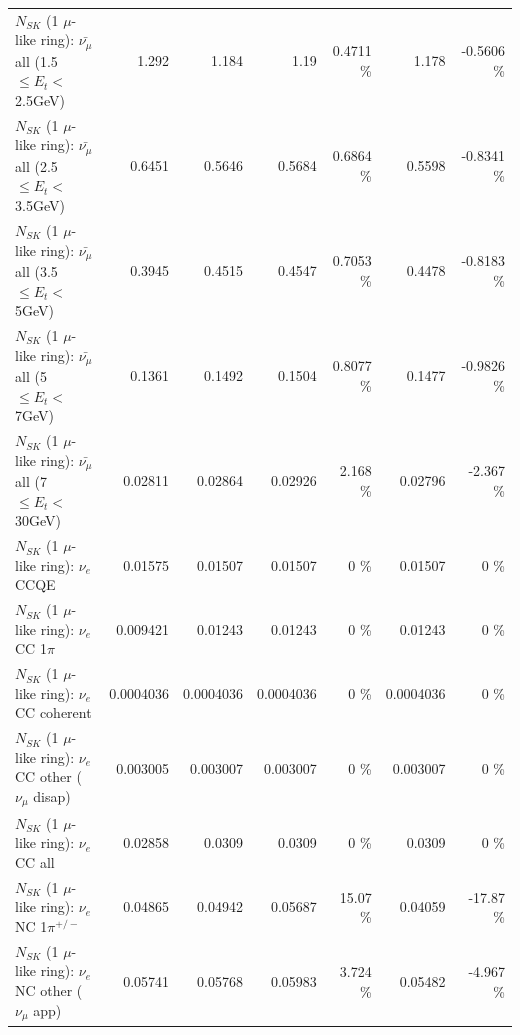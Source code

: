 \begin{table}
\begin{tabular}{| l | r | r | r  r | r  r |}
 $N_{SK}$ (1 $\mu$-like ring): $\bar{\nu_{\mu}}$ all (1.5 $\leq E_{t} <$ 2.5GeV) &           1.292 &           1.184 &            1.19 &   0.4711 \%  &           1.178 &  -0.5606 \%  \\ 
 $N_{SK}$ (1 $\mu$-like ring): $\bar{\nu_{\mu}}$ all (2.5 $\leq E_{t} <$ 3.5GeV) &          0.6451 &          0.5646 &          0.5684 &   0.6864 \%  &          0.5598 &  -0.8341 \%  \\ 
   $N_{SK}$ (1 $\mu$-like ring): $\bar{\nu_{\mu}}$ all (3.5 $\leq E_{t} <$ 5GeV) &          0.3945 &          0.4515 &          0.4547 &   0.7053 \%  &          0.4478 &  -0.8183 \%  \\ 
     $N_{SK}$ (1 $\mu$-like ring): $\bar{\nu_{\mu}}$ all (5 $\leq E_{t} <$ 7GeV) &          0.1361 &          0.1492 &          0.1504 &   0.8077 \%  &          0.1477 &  -0.9826 \%  \\ 
    $N_{SK}$ (1 $\mu$-like ring): $\bar{\nu_{\mu}}$ all (7 $\leq E_{t} <$ 30GeV) &         0.02811 &         0.02864 &         0.02926 &    2.168 \%  &         0.02796 &   -2.367 \%  \\ 
\hline
\hline
\hline
                                      $N_{SK}$ (1 $\mu$-like ring): $\nu_e$ CCQE &         0.01575 &         0.01507 &         0.01507 &        0 \%  &         0.01507 &        0 \%  \\ 
                                 $N_{SK}$ (1 $\mu$-like ring): $\nu_e$ CC 1$\pi$ &        0.009421 &         0.01243 &         0.01243 &        0 \%  &         0.01243 &        0 \%  \\ 
                               $N_{SK}$ (1 $\mu$-like ring): $\nu_e$ CC coherent &       0.0004036 &       0.0004036 &       0.0004036 &        0 \%  &       0.0004036 &        0 \%  \\ 
                $N_{SK}$ (1 $\mu$-like ring): $\nu_e$ CC other ($\nu_\mu$ disap) &        0.003005 &        0.003007 &        0.003007 &        0 \%  &        0.003007 &        0 \%  \\ 
                                  $N_{SK}$ (1 $\mu$-like ring): $\nu_{e}$ CC all &         0.02858 &          0.0309 &          0.0309 &        0 \%  &          0.0309 &        0 \%  \\ 
\hline
                           $N_{SK}$ (1 $\mu$-like ring): $\nu_e$ NC 1$\pi^{+/-}$ &         0.04865 &         0.04942 &         0.05687 &    15.07 \%  &         0.04059 &   -17.87 \%  \\ 
                  $N_{SK}$ (1 $\mu$-like ring): $\nu_e$ NC other ($\nu_\mu$ app) &         0.05741 &         0.05768 &         0.05983 &    3.724 \%  &         0.05482 &   -4.967 \%  \\ 

\end{tabular}
\end{table}

